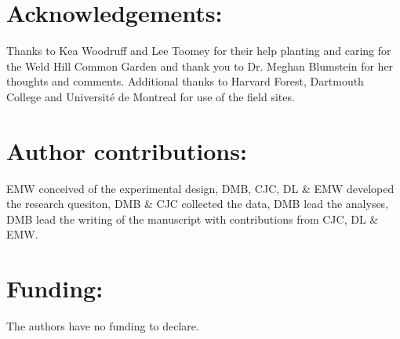 \documentclass{article}[12pt]
\begin{document}



\section*{Acknowledgements:}
Thanks to Kea Woodruff and Lee Toomey for their help planting and caring for the Weld Hill Common Garden and thank you to Dr. Meghan Blumstein for her thoughts and comments. Additional thanks to Harvard Forest, Dartmouth College and Université de Montreal for use of the field sites.

\section*{Author contributions:}
EMW conceived of the experimental design, DMB, CJC, DL \& EMW developed the research quesiton, DMB \& CJC collected the data, DMB lead the analyses, DMB lead the writing of the manuscript with contributions from CJC, DL \& EMW.

\section*{Funding:}
The authors have no funding to declare.
\end{document}
